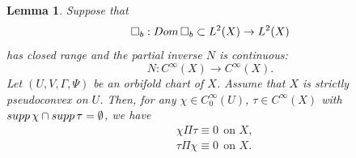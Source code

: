\documentclass[10pt,a4paper]{amsart}
\newtheorem{lemma}{Lemma}
\begin{document}
\begin{lemma}\label{l-gue251206yyd}
Suppose  that \[\square_b: {\rm Dom\,}\square_b\subset L^2(X)\rightarrow L^2(X)\]
has closed range and the partial inverse $N$ is continuous:
\[N: C^\infty(X)\rightarrow C^\infty(X).\]
Let $(U, V, \Gamma, \Psi)$
be an orbifold chart of $X$. Assume that $X$ is strictly pseudoconvex on $U$. Then, for any $\chi\in C^\infty_0(U)$, $\tau\in C^\infty(X)$ with 
${\rm supp\,}\chi\cap{\rm supp\,}\tau=\emptyset$, we have 
\begin{equation}\label{e-gue251209yyds}\begin{split}
    &\chi\Pi\tau\equiv0\ \ \mbox{on $X$},\\
    &\tau\Pi\chi\equiv0\ \ \mbox{on $X$}.
\end{split}
\end{equation}
\end{lemma} 
\end{document}
